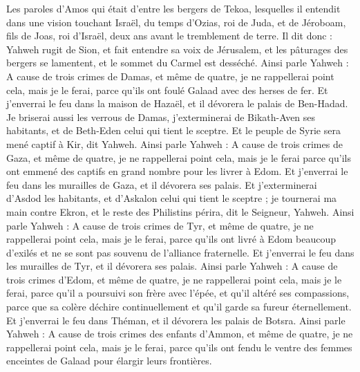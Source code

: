 \begin{multicols}{2}
\VerseOne{}Les paroles d'Amos qui était d'entre les bergers de Tekoa, lesquelles il entendit dans une vision touchant Israël, du temps d'Ozias, roi de Juda, et de Jéroboam, fils de Joas, roi d'Israël, deux ans avant le tremblement de terre.
Il dit donc : Yahweh rugit de Sion, et fait entendre sa voix de Jérusalem, et les pâturages des bergers se lamentent, et le sommet du Carmel est desséché.
Ainsi parle Yahweh : A cause de trois crimes de Damas, et même de quatre, je ne rappellerai point cela, mais je le ferai, parce qu'ils ont foulé Galaad avec des herses de fer.
Et j'enverrai le feu dans la maison de Hazaël, et il dévorera le palais de Ben-Hadad.
Je briserai aussi les verrous de Damas, j'exterminerai de Bikath-Aven ses habitants, et de Beth-Eden celui qui tient le sceptre. Et le peuple de Syrie sera mené captif à Kir, dit Yahweh.
Ainsi parle Yahweh : A cause de trois crimes de Gaza, et même de quatre, je ne rappellerai point cela, mais je le ferai parce qu'ils ont emmené des captifs en grand nombre pour les livrer à Edom.
Et j'enverrai le feu dans les murailles de Gaza, et il dévorera ses palais.
Et j'exterminerai d'Asdod les habitants, et d'Askalon celui qui tient le sceptre ; je tournerai ma main contre Ekron, et le reste des Philistins périra, dit le Seigneur, Yahweh.
Ainsi parle Yahweh : A cause de trois crimes de Tyr, et même de quatre, je ne rappellerai point cela, mais je le ferai, parce qu'ils ont livré à Edom beaucoup d'exilés et ne se sont pas souvenu de   l'alliance fraternelle.
Et j'enverrai le feu dans les murailles de Tyr, et il dévorera ses palais.
Ainsi parle Yahweh : A cause de trois crimes d'Edom, et même de quatre, je ne rappellerai point cela, mais je le ferai, parce qu'il a poursuivi son frère avec l'épée, et qu'il altéré ses compassions, parce que sa colère déchire continuellement et qu'il garde sa fureur éternellement.
Et j'enverrai le feu dans Théman, et il dévorera les palais de Botsra.
Ainsi parle Yahweh : A cause de trois crimes des enfants d'Ammon, et même de quatre, je ne rappellerai point cela, mais je le ferai, parce qu'ils ont fendu le ventre des femmes enceintes de Galaad pour élargir leurs frontières.

\end{multicols}
